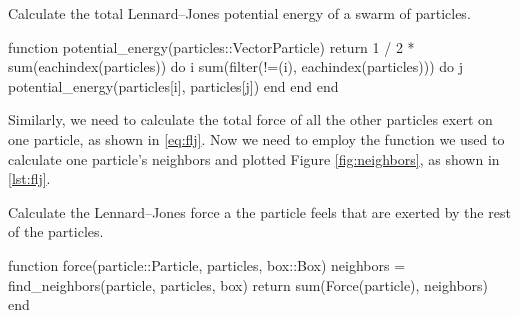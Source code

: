 \begin{algorithm}
    \caption{Calculate the total Lennard--Jones potential energy of a swarm of particles.}
    \label{lst:U}
    \begin{juliacode}
        function potential_energy(particles::Vector{Particle})
            return 1 / 2 * sum(eachindex(particles)) do i
                sum(filter(!=(i), eachindex(particles))) do j
                    potential_energy(particles[i], particles[j])
                end
            end
        end
    \end{juliacode}
\end{algorithm}

Similarly, we need to calculate the total force of all the other particles
exert on one particle, as shown in \eqref{eq:flj}. Now we need to employ the
 function we used to calculate one particle's neighbors and plotted
Figure \ref{fig:neighbors}, as shown in \ref{lst:flj}.
%
\begin{algorithm}
    \caption{Calculate the Lennard--Jones force a the particle feels that are exerted by
        the rest of the particles.}
    \label{lst:flj}
    \begin{juliacode}
        function force(particle::Particle, particles, box::Box)
            neighbors = find_neighbors(particle, particles, box)
            return sum(Force(particle), neighbors)
        end
    \end{juliacode}
\end{algorithm}
